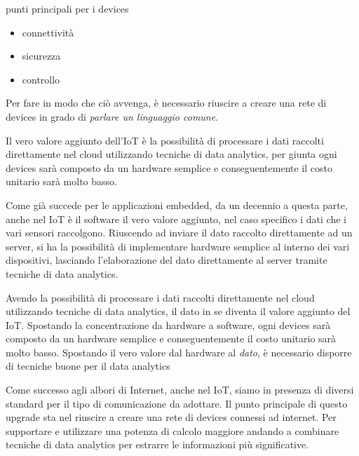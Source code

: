 punti principali per i devices
\begin{itemize}
\item connettività
\item sicurezza
\item controllo
\end{itemize}

Per fare in modo che ciò  avvenga, è necessario riuscire a creare una
rete di devices in grado di  
\textit{parlare un linguaggio comune}. 

\begin{tcolorbox}
Il vero valore aggiunto dell'IoT è la possibilità di processare i dati raccolti
direttamente nel cloud utilizzando tecniche di data analytics, per giunta
ogni devices sarà composto da un hardware semplice e conseguentemente il costo
unitario sarà molto basso.
\end{tcolorbox}

Come già succede per le applicazioni embedded, da un decennio a questa parte,
anche nel IoT è il software il vero valore aggiunto, nel caso specifico i dati
che i vari sensori raccolgono. Riuscendo ad inviare il dato raccolto
direttamente ad un server, si ha la possibilità di implementare hardware
semplice al interno dei vari dispositivi, lasciando l'elaborazione del dato
direttamente al server tramite tecniche di data analytics.

\begin{tcolorbox}
Avendo la possibilità di processare i dati raccolti
direttamente nel cloud utilizzando tecniche di data analytics, il dato in se
diventa il valore aggiunto del IoT. Spostando la concentrazione da hardware a
software,  ogni devices sarà composto da un hardware semplice e conseguentemente il costo
unitario sarà molto basso.
Spostando il vero valore dal hardware al \emph{dato}, è necessario disporre di
tecniche buone per il data analytics

Come successo agli albori di Internet, anche nel IoT, siamo in presenza di
diversi standard per il tipo di comunicazione da adottare.
Il punto principale di questo
upgrade sta nel riuscire a creare una rete di devices connessi ad internet. Per
supportare e utilizzare una potenza di calcolo maggiore andando a combinare
tecniche di data analytics per estrarre le informazioni più significative. 
\end{tcolorbox}
